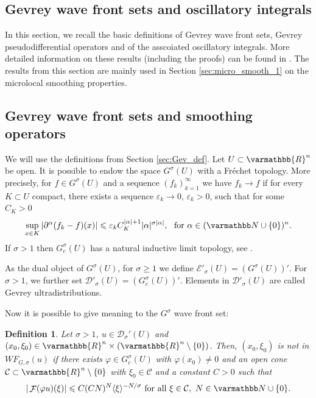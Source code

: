 \documentclass[12pt,twoside]{amsart}
\numberwithin{equation}{section}
\renewcommand{\leq}{\leqslant}
\renewcommand{\geq}{\geqslant}
\renewcommand{\mathbb}{\varmathbb}
\newtheorem{definition}[theorem]{Definition}
\newcommand {\R} {\mathbb{R}} \newcommand {\Z} {\mathbb{Z}}
\DeclareMathOperator{\F} {\mathcal{F}}
\newcommand{\eps}{\varepsilon}
\begin{document}
\begin{appendix}
\section{Gevrey wave front sets and oscillatory integrals}
\label{sec:Gevrey}

In this section, we recall the basic definitions of Gevrey wave front sets, Gevrey pseudodifferential operators and of the asscoiated oscillatory integrals. More detailed information on these results (including the proofs) can be found in \cite{Rodino_book}. The results from this section are mainly used in Section \ref{sec:micro_smooth_1} on the microlocal smoothing properties.

\subsection{Gevrey wave front sets and smoothing operators}
\label{sec:analytic}


We will use the definitions from Section \ref{sec:Gev_def}. Let $U \subset \R^n$ be open. It is possible to endow the space $G^{\sigma}(U)$ with a Fr{\'e}chet topology. More precisely, for $f\in G^{\sigma}(U)$ and a sequence $(f_k)_{k=1}^{\infty}$ we have $f_k \rightarrow f$ if for every $K\subset U$ compact, there exists a sequence $\eps_k \rightarrow 0$, $\eps_k>0$, such that for some $C_K>0$
\begin{align*}
\sup\limits_{x\in K}|\partial^{\alpha}(f_k - f)(x)| \leq \eps_k C_K^{|\alpha|+1}|\alpha|^{\sigma |\alpha|}, \ \mbox{ for } \alpha \in (\N \cup \{0\})^n.
\end{align*}
If $\sigma > 1$ then $G^{\sigma}_c(U)$ has a natural inductive limit topology, see \cite[Section 1.4]{Rodino_book}.

As the dual object of $G^{\sigma}(U)$, for $\sigma\geq 1$ we define $\mathcal{E}'_{\sigma}(U)=(G^{\sigma}(U))'$. For $\sigma>1$, we further set $\mathcal{D}'_{\sigma}(U)=(G^{\sigma}_c(U))'$. Elements in $\mathcal{D}'_{\sigma}(U)$ are called Gevrey ultradistributions.

Now it is possible to give meaning to the $G^{\sigma} $ wave front set:

\begin{definition}
\label{defi:WF}
Let $\sigma > 1$, $u \in \mathcal{D}_{\sigma}'(U)$ and $(x_0,\xi_0)\in \R^n \times (\R^n\setminus \{0\})$. Then, $(x_0,\xi_0)$ is not in $WF_{G,\sigma}(u)$ if there exists $\varphi \in G^{\sigma}_c(U)$ with $\varphi(x_0) \neq 0$ and an open cone $\mathcal{C} \subset \R^n \setminus \{0\}$ with $\xi_0 \in \mathcal{C}$ and a constant $C>0$ such that
\begin{align*}
|\F(\varphi u)(\xi)| \leq C(CN)^N \langle \xi \rangle^{-N/\sigma} \mbox{ for all } \xi \in \mathcal{C}, \ N \in \N\cup \{0\}.
\end{align*} 
\end{definition}


\end{appendix}
\end{document}
